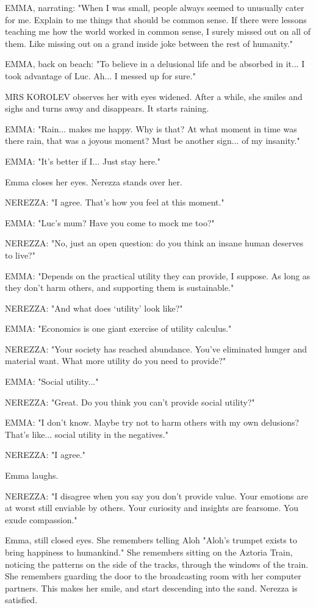 \documentclass[11pt]{article}
\begin{document}
EMMA, narrating: "When I was small, people always seemed to unusually cater for me.
Explain to me things that should be common sense.
If there were lessons teaching me how the world worked in common sense, I surely missed out on all of them.
Like missing out on a grand inside joke between the rest of humanity."

EMMA, back on beach: "To believe in a delusional life and be absorbed in it...
I took advantage of Luc.
Ah... I messed up for sure."

MRS KOROLEV observes her with eyes widened.
After a while, she smiles and sighs and turns away and disappears.
It starts raining.

EMMA: "Rain... makes me happy. 
Why is that?
At what moment in time was there rain, that was a joyous moment?
Must be another sign... of my insanity."

EMMA: "It's better if I... 
Just stay here."

Emma closes her eyes.
Nerezza stands over her. 

NEREZZA: "I agree. 
That's how you feel at this moment."

EMMA: "Luc's mum? Have you come to mock me too?"

NEREZZA: "No, just an open question: do you think an insane human deserves to live?"

EMMA: "Depends on the practical utility they can provide, I suppose.
As long as they don't harm others, and supporting them is sustainable."

NEREZZA: "And what does `utility' look like?"

EMMA: "Economics is one giant exercise of utility calculus."

NEREZZA: "Your society has reached abundance.
You've eliminated hunger and material want.
What more utility do you need to provide?"

EMMA: "Social utility..."

NEREZZA: "Great. Do you think you can't provide social utility?"

EMMA: "I don't know. 
Maybe try not to harm others with my own delusions?
That's like... social utility in the negatives."

NEREZZA: "I agree."

Emma laughs.

NEREZZA: "I disagree when you say you don't provide value.
Your emotions are at worst still enviable by others.
Your curiosity and insights are fearsome.
You exude compassion."

Emma, still closed eyes.
She remembers telling Aloh "Aloh's trumpet exists to bring happiness to humankind."
She remembers sitting on the Aztoria Train, noticing the patterns on the side of the tracks, through the windows of the train.
She remembers guarding the door to the broadcasting room with her computer partners.
This makes her smile, and start descending into the sand.
Nerezza is satisfied.
\end{document}
